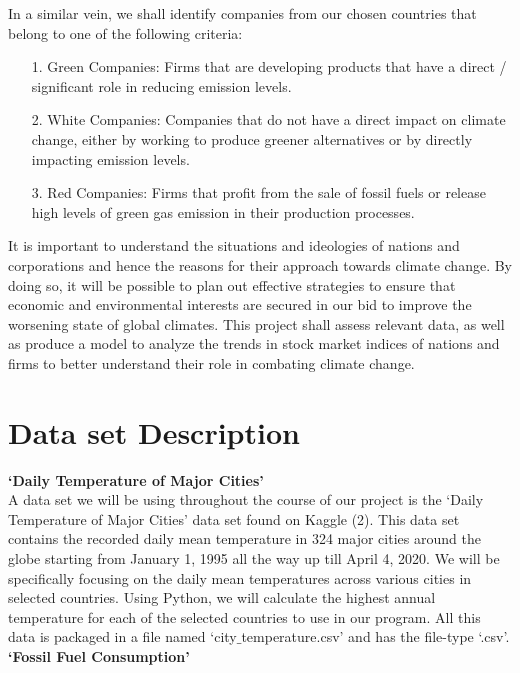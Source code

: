\documentclass[fontsize=11pt]{article}
\begin{document}
\noindent In a similar vein, we shall identify companies from our chosen countries that belong to one of the following criteria:\

\begin{enumerate}
    \item[1.] Green Companies: Firms that are developing products that have a direct / significant role in reducing emission levels.
    \item[2.] White Companies: Companies that do not have a direct impact on  climate change, either by working to produce greener alternatives or by directly impacting emission levels.
    \item[3.] Red Companies: Firms that profit from the sale of fossil fuels or release high levels of green gas emission in their production processes.
\end{enumerate}

It is important to understand the situations and ideologies of nations
and corporations and hence the reasons for their approach towards
climate change. By doing so, it will be possible to plan out effective
strategies to ensure that economic and environmental interests are
secured in our bid to improve the worsening state of global climates.
This project shall assess relevant data, as well as produce a model to
analyze the trends in stock market indices of nations and firms to better understand their role in combating climate change. \\


\section*{Data set Description}
\textbf{‘Daily Temperature of Major Cities’}\\

A data set we will be using throughout the course of our project is the ‘Daily Temperature of Major Cities’ data set found on Kaggle (2). This data set contains the recorded daily mean temperature in 324 major cities around the globe starting from January 1, 1995 all the way up till April 4, 2020. We will be specifically focusing on the daily mean temperatures across various cities in selected countries. Using Python, we will calculate the highest annual temperature for each of the selected countries to use in our program. All this data is packaged in a file named ‘city$\_$temperature.csv’ and has the file-type ‘.csv’. \\

\noindent \textbf{‘Fossil Fuel Consumption’}\\
\end{document}
